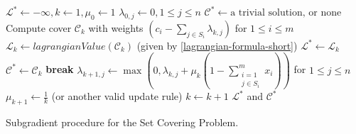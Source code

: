 \begin{enumerate}
    \begin{algorithm}[h]
    \begin{algorithmic}[1]
    \STATE $\mathcal{L}^\ast \gets -\infty, k \gets 1, \mu_0 \gets 1$
    \STATE $\lambda_{0,j} \gets 0, 1 \le j \le n$
    \STATE $\mathcal{C}^\ast \gets \text{a trivial solution, or none}$
        \STATE Compute cover $\mathcal{C}_k$ with weights $\left(c_i - \sum_{j \in S_i} \lambda_{k,j}\right)$ for $1 \le i \le m$
        \STATE $\mathcal{L}_k \gets lagrangianValue\left(\mathcal{C}_k\right)$ (given by \cref{lagrangian-formula-short})
            \STATE $\mathcal{L}^\ast \gets \mathcal{L}_k$
        \ENDIF
            \STATE $\mathcal{C}^\ast \gets \mathcal{C}_k$
        \ENDIF
            \STATE \textbf{break}
        \ENDIF
        \STATE $\lambda_{k+1,j} \gets \max \left(0, \lambda_{k,j} + \mu_k \left(1 - \sum_{\substack{i=1\\j\in S_i}}^m x_i \right)\right)$ for $1 \le j \le n$
        \STATE $\mu_{k+1} \gets \frac{1}{k}$ (or another valid update rule)
        \STATE $k \gets k+1$
    \ENDWHILE
    \RETURN $\mathcal{L}^\ast$ and $\mathcal{C}^\ast$
    \end{algorithmic}
    \caption{Subgradient procedure for the Set Covering Problem.}
    \label{subgradient}
    \end{algorithm}
\end{enumerate}
